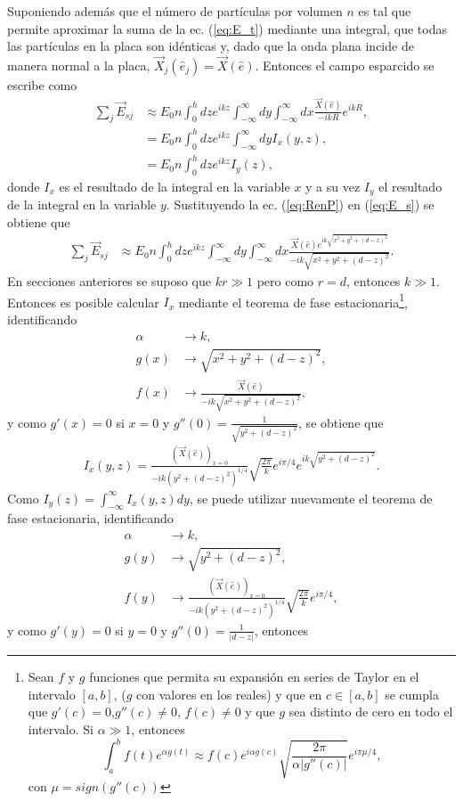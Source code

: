 Suponiendo además que el número de partículas por volumen $n$ es tal que permite aproximar la suma de la ec. (\eqref{eq:E_t}) mediante una integral, que todas las partículas en la placa son idénticas y, dado que la onda plana incide de manera normal a la placa, $\vec{X}_j(\hat{e}_j) = \vec{X}(\hat{e})$. Entonces el campo esparcido se escribe como
\begin{align}
\sum_j \vec{E}_{sj} &\approx E_0 n
							 \int_0^h dz e^{ikz} 
							 \int_{-\infty}^\infty dy
							 \int_{-\infty}^\infty dx \frac{\vec{X}(\hat{e})}{-ikR} e^{ikR},\label{eq:E_s}  \\
				& = E_0 n \int_0^h dz e^{ikz}  \int_{-\infty}^\infty dy I_x(y,z),\\
				&= E_0 n \int_0^h dz e^{ikz}  I_y(z),
\end{align}
donde $I_x$ es el resultado de la integral en la variable $x$ y a su vez $I_y$ el resultado de la integral en la variable $y$. Sustituyendo la ec. (\ref{eq:RenP}) en (\ref{eq:E_s}) se obtiene que 
\begin{align}
\sum_j \vec{E}_{sj} &\approx E_0 n
							 \int_0^h dz e^{ikz} 
							 \int_{-\infty}^\infty dy
							 \int_{-\infty}^\infty dx 
			\frac{\vec{X}(\hat{e})    e^{ik\sqrt{x^2 + y^2 + (d-z)^2}}}
			{-ik \sqrt{x^2 + y^2 + (d-z)^2}}.
\end{align}
En secciones anteriores se suposo que $k r \gg 1$ pero como $r=d$, entonces $k\gg1$. Entonces es posible calcular $I_x$ mediante el teorema de fase estacionaria\footnote{Sean $f$ y $g$  funciones que permita su expansión en series de Taylor en el intervalo $[a,b]$, ($g$  con valores en los reales) y que en $c\in[a,b]$ se cumpla que $g'(c) = 0$,$g''(c) \not= 0$, $f(c)\not= 0$ y que $g$ sea distinto de cero en todo el intervalo. Si $\alpha \gg 1$, entonces
\begin{equation}
\int_a^b f(t) e^{\alpha g(t)} \approx f(c) e^{i\alpha g(c)}\sqrt{\frac{2\pi}{\alpha |g''(c)|}}e^{i\pi\mu/4},
\end{equation}
 con $\mu = sign(g''(c))$}, identificando 
 \begin{align*}
 \alpha &\rightarrow k, \\
 g(x) &\rightarrow \sqrt{x^2 + y^2 + (d-z)^2}, \\
 f(x) &\rightarrow  \frac{\vec{X}(\hat{e}) }{-ik \sqrt{x^2 + y^2 + (d-z)^2}},
 \end{align*}
y como $g'(x)=0$ si $x=0$ y $g''(0) = \frac{1}{\sqrt{y^2+(d-z)^2}}$, se obtiene que
\begin{align}
I_x (y,z) = \frac{(\vec{X}(\hat{e}))_{x=0} }{-ik (y^2+(d-z)^2)^{1/4}} \sqrt{\frac{2\pi}{k}} e^{i\pi/4}   e^{ik\sqrt{y^2+(d-z)^2}}.  \label{eq:Ix}
\end{align}
Como $I_y (z) = \int_{-\infty}^{\infty} I_x(y,z) dy$, se puede utilizar nuevamente el teorema de fase estacionaria, identificando 
 \begin{align*}
 \alpha &\rightarrow k, \\
 g(y) &\rightarrow \sqrt{ y^2 + (d-z)^2}, \\
 f(y) &\rightarrow  \frac{(\vec{X}(\hat{e}))_{x=0} }{-ik (y^2+(d-z)^2)^{1/4}} \sqrt{\frac{2\pi}{k}} e^{i\pi/4},
 \end{align*}
y como $g'(y)=0$ si $y=0$ y $g''(0) = \frac{1}{|d-z|}$, entonces

